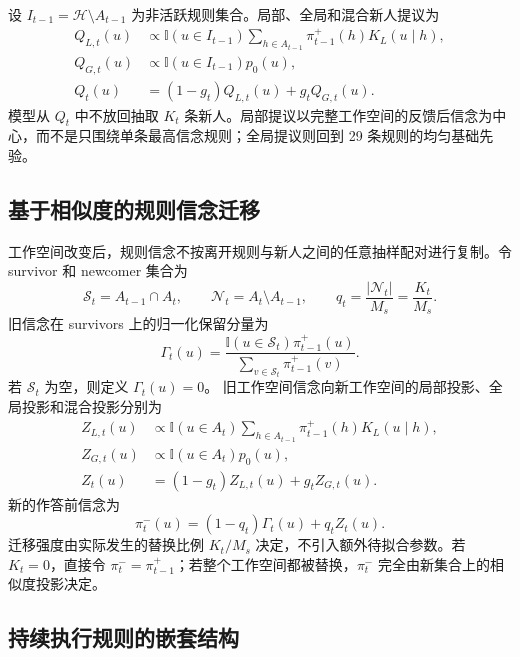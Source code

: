 \documentclass[12pt]{article}
\newcommand{\ind}{\mathbb I}
\begin{document}
设 $I_{t-1}=\mathcal H\setminus A_{t-1}$ 为非活跃规则集合。局部、全局和混合新人提议为
\begin{align}
Q_{L,t}(u)
&\propto
\ind(u\in I_{t-1})
\sum_{h\in A_{t-1}}
\pi_{t-1}^{+}(h)K_L(u\mid h),
\nonumber\\
Q_{G,t}(u)
&\propto
\ind(u\in I_{t-1})p_0(u),
\nonumber\\
Q_t(u)
&=(1-g_t)Q_{L,t}(u)+g_tQ_{G,t}(u).
\label{eq:newcomer-proposal}
\end{align}
模型从 $Q_t$ 中不放回抽取 $K_t$ 条新人。局部提议以完整工作空间的反馈后信念为中心，而不是只围绕单条最高信念规则；全局提议则回到 29 条规则的均匀基础先验。

\subsection{基于相似度的规则信念迁移}

工作空间改变后，规则信念不按离开规则与新人之间的任意抽样配对进行复制。令 survivor 和 newcomer 集合为
\begin{equation}
\mathcal S_t=A_{t-1}\cap A_t,
\qquad
\mathcal N_t=A_t\setminus A_{t-1},
\qquad
q_t=\frac{|\mathcal N_t|}{M_s}=\frac{K_t}{M_s}.
\label{eq:transport-fraction}
\end{equation}
旧信念在 survivors 上的归一化保留分量为
\begin{equation}
\Gamma_t(u)
=
\frac{
\ind(u\in\mathcal S_t)\pi_{t-1}^{+}(u)
}{
\sum_{v\in\mathcal S_t}\pi_{t-1}^{+}(v)
}.
\label{eq:survivor-carryover}
\end{equation}
若 $\mathcal S_t$ 为空，则定义 $\Gamma_t(u)=0$。
旧工作空间信念向新工作空间的局部投影、全局投影和混合投影分别为
\begin{align}
Z_{L,t}(u)
&\propto
\ind(u\in A_t)
\sum_{h\in A_{t-1}}
\pi_{t-1}^{+}(h)K_L(u\mid h),
\nonumber\\
Z_{G,t}(u)
&\propto
\ind(u\in A_t)p_0(u),
\nonumber\\
Z_t(u)
&=(1-g_t)Z_{L,t}(u)+g_tZ_{G,t}(u).
\label{eq:semantic-projection}
\end{align}
新的作答前信念为
\begin{equation}
\boxed{
\pi_t^{-}(u)
=(1-q_t)\Gamma_t(u)+q_tZ_t(u)
}.
\label{eq:similarity-transport}
\end{equation}
迁移强度由实际发生的替换比例 $K_t/M_s$ 决定，不引入额外待拟合参数。若 $K_t=0$，直接令 $\pi_t^{-}=\pi_{t-1}^{+}$；若整个工作空间都被替换，$\pi_t^{-}$ 完全由新集合上的相似度投影决定。

\subsection{持续执行规则的嵌套结构}
\end{document}
